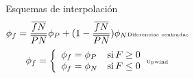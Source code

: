 \begin{frame}
\begin{columns}
        \begin{block}{}
          \footnotesize
          \centering Esquemas de interpolaci\'on
          \begin{eqnarray*}
            \phi_f = \frac{\overline{fN}}{\overline{PN}}\phi_P + (1-\frac{\overline{fN}}{\overline{PN}})\phi_N     &     \mbox{\tiny Diferencias centradas}
          \end{eqnarray*}
          \begin{eqnarray*}
            \phi_f = \left \{ 
            \begin{array}{ll} 
              \phi_f = \phi_P & \mbox{si} \, F\geq 0 \\
              \phi_f = \phi_N & \mbox{si} \, F\leq 0 
            \end{array}
            \right .  & \mbox{\tiny Upwind}
          \end{eqnarray*}
        \end{block}

    \end{columns}

\end{frame}       














